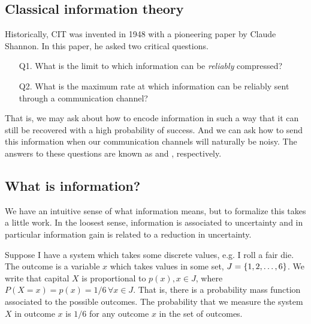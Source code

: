 \subsection*{Classical information theory} Historically, CIT was invented in 1948 with a pioneering paper by Claude Shannon. In this paper, he asked two critical questions.
\begin{itemize}
    \item[Q1.] What is the limit to which information can be \emph{reliably} compressed?
    \item[Q2.] What is the maximum rate at which information can be reliably sent through a communication channel?
\end{itemize}
That is, we may ask about how to encode information in such a way that it can still be recovered with a high probability of success. And we can ask how to send this information when our communication channels will naturally be noisy. The answers to these questions are known as  and , respectively.

\subsection*{What is information?} We have an intuitive sense of what information means, but to formalize this takes a little work. In the loosest sense, information is associated to uncertainty and in particular information gain is related to a reduction in uncertainty.
\begin{exm}
Suppose I have a system which takes some discrete values, e.g. I roll a fair die. The outcome is a variable $x$ which takes values in some set, $J=\{1,2,\ldots, 6\}$. We write that capital $X$ is proportional to $p(x),x\in J$, where $P(X=x)=p(x)=1/6\, \forall x\in J$. That is, there is a probability mass function associated to the possible outcomes. The probability that we measure the system $X$ in outcome $x$ is $1/6$ for any outcome $x$ in the set of outcomes.
\end{exm}

